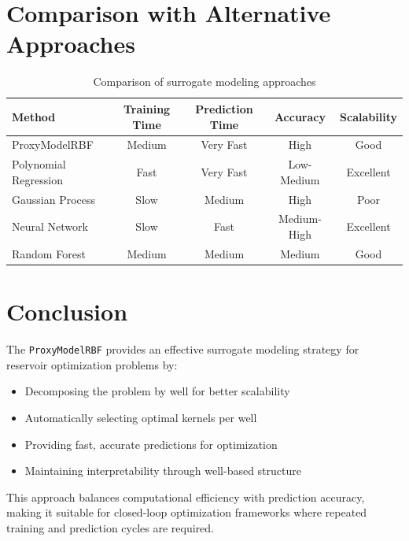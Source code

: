 \documentclass[11pt]{article}
\begin{document}
\section{Comparison with Alternative Approaches}

\begin{table}[h]
\centering
\begin{tabular}{|l|c|c|c|c|}
\hline
\textbf{Method} & \textbf{Training Time} & \textbf{Prediction Time} & \textbf{Accuracy} & \textbf{Scalability} \\ \hline
ProxyModelRBF & Medium & Very Fast & High & Good \\ \hline
Polynomial Regression & Fast & Very Fast & Low-Medium & Excellent \\ \hline
Gaussian Process & Slow & Medium & High & Poor \\ \hline
Neural Network & Slow & Fast & Medium-High & Excellent \\ \hline
Random Forest & Medium & Medium & Medium & Good \\ \hline
\end{tabular}
\caption{Comparison of surrogate modeling approaches}
\end{table}

\section{Conclusion}

The \texttt{ProxyModelRBF} provides an effective surrogate modeling strategy for reservoir optimization problems by:
\begin{itemize}
    \item Decomposing the problem by well for better scalability
    \item Automatically selecting optimal kernels per well
    \item Providing fast, accurate predictions for optimization
    \item Maintaining interpretability through well-based structure
\end{itemize}

This approach balances computational efficiency with prediction accuracy, making it suitable for closed-loop optimization frameworks where repeated training and prediction cycles are required.
\end{document}
